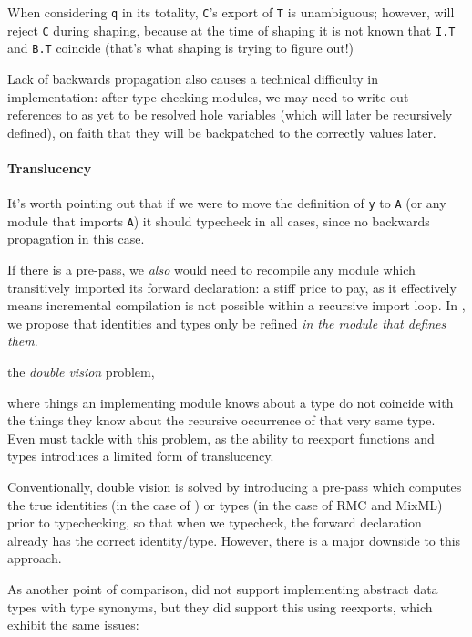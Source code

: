 When considering \verb|q| in its totality,
\verb|C|'s export of \verb|T| is unambiguous; however, \OldBackpack{} will
reject \verb|C| during shaping, because at the time of shaping
it is not known that \verb|I.T| and \verb|B.T| coincide (that's
what shaping is trying to figure out!)

Lack of backwards propagation also causes a technical difficulty in
implementation: after type checking modules, we may need to write out
references to as yet to be resolved hole variables (which will later be
recursively defined), on faith that they will be backpatched to the
correctly values later.

\paragraph{Translucency}

  It's worth
pointing out that if we were to move the definition of \verb|y| to
\verb|A| (or any module that imports \verb|A|) it should typecheck in
all cases, since no backwards propagation in this case.


If there is a pre-pass, we \emph{also} would need to
recompile any module which transitively imported its forward
declaration: a stiff price to pay, as it effectively means incremental
compilation is not possible within a recursive import loop.  In \Backpack{},
we propose that identities and types only be refined \emph{in the module
that defines them}.


the \emph{double vision} problem,

where things an implementing module knows about a type do not coincide
with the things they know about the recursive occurrence of that very
same type.  Even \OldBackpack{} must tackle with this problem, as the
ability to reexport functions and types introduces a limited form
of translucency.

Conventionally, double vision is solved by introducing a pre-pass which
computes the true identities (in the case of \OldBackpack{}) or types
(in the case of RMC and MixML) prior to typechecking, so that when we
typecheck, the forward declaration already has the correct
identity/type.  However, there is a major downside to this approach.

As another point of comparison, \OldBackpack{} did not support
implementing abstract data types with type synonyms, but they
did support this using reexports, which exhibit the same issues:


